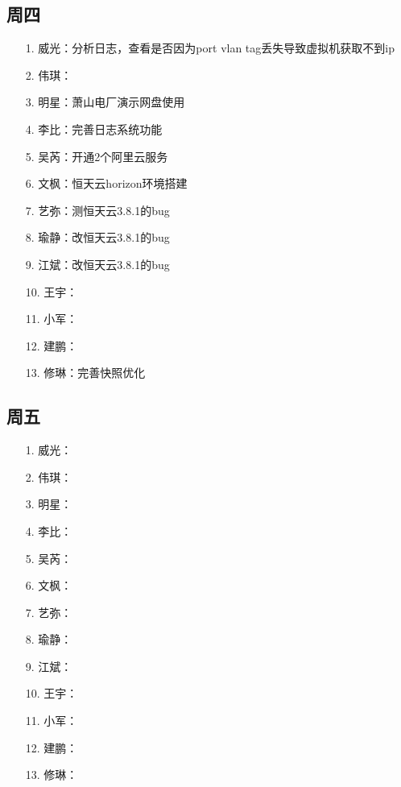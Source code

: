 \documentclass[a4paper,left=1.5cm,right=1.5cm,11pt]{article}
\begin{document}
\subsection{周四}
    \begin{itemize}
        \item[1.]威光：分析日志，查看是否因为port vlan tag丢失导致虚拟机获取不到ip
		\item[2.]伟琪：
		\item[3.]明星：萧山电厂演示网盘使用
		\item[4.]李比：完善日志系统功能
		\item[5.]吴芮：开通2个阿里云服务
		\item[6.]文枫：恒天云horizon环境搭建
		\item[7.]艺弥：测恒天云3.8.1的bug
		\item[8.]瑜静：改恒天云3.8.1的bug
		\item[9.]江斌：改恒天云3.8.1的bug
		\item[10.]王宇：
		\item[11.]小军：
		\item[12.]建鹏：
		\item[13.]修琳：完善快照优化
    \end{itemize}
\subsection{周五}
	\begin{itemize}
		\item[1.]威光：
		\item[2.]伟琪：
		\item[3.]明星：
		\item[4.]李比：
		\item[5.]吴芮：
		\item[6.]文枫：
		\item[7.]艺弥：
		\item[8.]瑜静：
		\item[9.]江斌：
		\item[10.]王宇：
		\item[11.]小军：
		\item[12.]建鹏：
		\item[13.]修琳：
	\end{itemize}
\end{document}
